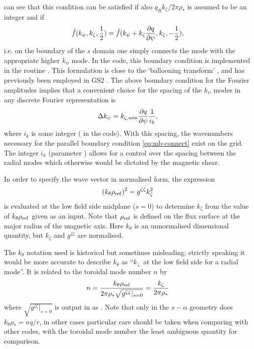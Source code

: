 can see that this condition can be satisfied if also $q_R k_\zeta / 2 \pi \rho_*$ is assumed to be an integer and if 
\begin{equation} 
\hat f(k_\psi, k_\zeta, {1\over 2} ) = \hat f( k_\psi + k_\zeta \frac{\partial  q}{\partial \psi} , k_\zeta, -{1 \over 2} ) ,
\label{eq:mb-connect}
\end{equation}
i.e. on the boundary of the $s$ domain one simply connects the mode with the appropriate higher $k_\psi$ mode. 
In the code, this boundary condition is implemented in the routine .
This formulation is close to the `ballooning transform' \cite{CON}, and has previously been employed in GS2 \cite{KOT95,DOR00}. 
The above boundary condition for the Fourier amplitudes implies that a convenient choice for the spacing of 
the $k_\psi$ modes in any discrete Fourier representation is 
\begin{equation} 
\label{ikxspace}
\Delta k_\psi = k_{\zeta,{\rm min}} \frac{\partial  q}{\partial \psi} {1 \over i_k} ,
\end{equation}
where $i_k$ is some integer ( in the code). With this spacing, the wavenumbers necessary for the parallel boundary condition \eqref{eq:mb-connect} exist on the grid. The integer $i_k$ (parameter ) allows for a control over the spacing between the radial modes which otherwise 
would be dictated by the magnetic shear. 

In order to specify the wave vector in normalised form, the expression 
\begin{equation} 
(k_\theta \rho_{\rm ref} )^2 = g^{\zeta \zeta} k_\zeta^2 
\label{kperp}
\end{equation}
is evaluated at the low field side midplane ($s=0$) to determine $k_\zeta$ from the value of $k_\theta \rho_{\rm ref}$ given as an input. Note that $\rho_{\rm ref}$ is defined on the flux surface at the major radius of the magnetic axis.  Here $k_\theta$ is an unnormalised dimensional quantity, but $k_\zeta$ and $g^{\zeta \zeta}$ are normalised. 

The $k_\theta$ notation used is historical but sometimes misleading; strictly speaking it would be more accurate to describe $k_\theta$ as
``$k_\perp$ at the low field side for a radial mode''.  It is related to the toroidal mode number $n$ by
\begin{equation}
n = \frac{k_\theta \rho_{\rm ref}}{2 \pi \rho_* \sqrt{g^{\zeta \zeta}|_{s=0}}} = \frac{k_\zeta}{2 \pi \rho_*} 
\label{modenumber}
\end{equation}
where $\sqrt{g^{\zeta \zeta}|_{s=0}}$ is output in  as .  
Note that only in the $s-\alpha$ geometry does $k_\theta \rho_* = n q / r$, in other cases particular 
care should be taken  when comparing with other codes, with the toroidal mode number the least ambiguous quantity for comparison.

